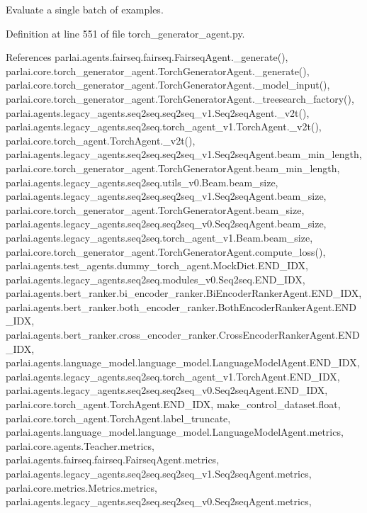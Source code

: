 \begin{DoxyVerb}Evaluate a single batch of examples.\end{DoxyVerb}
 

Definition at line 551 of file torch\+\_\+generator\+\_\+agent.\+py.



References parlai.\+agents.\+fairseq.\+fairseq.\+Fairseq\+Agent.\+\_\+generate(), parlai.\+core.\+torch\+\_\+generator\+\_\+agent.\+Torch\+Generator\+Agent.\+\_\+generate(), parlai.\+core.\+torch\+\_\+generator\+\_\+agent.\+Torch\+Generator\+Agent.\+\_\+model\+\_\+input(), parlai.\+core.\+torch\+\_\+generator\+\_\+agent.\+Torch\+Generator\+Agent.\+\_\+treesearch\+\_\+factory(), parlai.\+agents.\+legacy\+\_\+agents.\+seq2seq.\+seq2seq\+\_\+v1.\+Seq2seq\+Agent.\+\_\+v2t(), parlai.\+agents.\+legacy\+\_\+agents.\+seq2seq.\+torch\+\_\+agent\+\_\+v1.\+Torch\+Agent.\+\_\+v2t(), parlai.\+core.\+torch\+\_\+agent.\+Torch\+Agent.\+\_\+v2t(), parlai.\+agents.\+legacy\+\_\+agents.\+seq2seq.\+seq2seq\+\_\+v1.\+Seq2seq\+Agent.\+beam\+\_\+min\+\_\+length, parlai.\+core.\+torch\+\_\+generator\+\_\+agent.\+Torch\+Generator\+Agent.\+beam\+\_\+min\+\_\+length, parlai.\+agents.\+legacy\+\_\+agents.\+seq2seq.\+utils\+\_\+v0.\+Beam.\+beam\+\_\+size, parlai.\+agents.\+legacy\+\_\+agents.\+seq2seq.\+seq2seq\+\_\+v1.\+Seq2seq\+Agent.\+beam\+\_\+size, parlai.\+core.\+torch\+\_\+generator\+\_\+agent.\+Torch\+Generator\+Agent.\+beam\+\_\+size, parlai.\+agents.\+legacy\+\_\+agents.\+seq2seq.\+seq2seq\+\_\+v0.\+Seq2seq\+Agent.\+beam\+\_\+size, parlai.\+agents.\+legacy\+\_\+agents.\+seq2seq.\+torch\+\_\+agent\+\_\+v1.\+Beam.\+beam\+\_\+size, parlai.\+core.\+torch\+\_\+generator\+\_\+agent.\+Torch\+Generator\+Agent.\+compute\+\_\+loss(), parlai.\+agents.\+test\+\_\+agents.\+dummy\+\_\+torch\+\_\+agent.\+Mock\+Dict.\+E\+N\+D\+\_\+\+I\+DX, parlai.\+agents.\+legacy\+\_\+agents.\+seq2seq.\+modules\+\_\+v0.\+Seq2seq.\+E\+N\+D\+\_\+\+I\+DX, parlai.\+agents.\+bert\+\_\+ranker.\+bi\+\_\+encoder\+\_\+ranker.\+Bi\+Encoder\+Ranker\+Agent.\+E\+N\+D\+\_\+\+I\+DX, parlai.\+agents.\+bert\+\_\+ranker.\+both\+\_\+encoder\+\_\+ranker.\+Both\+Encoder\+Ranker\+Agent.\+E\+N\+D\+\_\+\+I\+DX, parlai.\+agents.\+bert\+\_\+ranker.\+cross\+\_\+encoder\+\_\+ranker.\+Cross\+Encoder\+Ranker\+Agent.\+E\+N\+D\+\_\+\+I\+DX, parlai.\+agents.\+language\+\_\+model.\+language\+\_\+model.\+Language\+Model\+Agent.\+E\+N\+D\+\_\+\+I\+DX, parlai.\+agents.\+legacy\+\_\+agents.\+seq2seq.\+torch\+\_\+agent\+\_\+v1.\+Torch\+Agent.\+E\+N\+D\+\_\+\+I\+DX, parlai.\+agents.\+legacy\+\_\+agents.\+seq2seq.\+seq2seq\+\_\+v0.\+Seq2seq\+Agent.\+E\+N\+D\+\_\+\+I\+DX, parlai.\+core.\+torch\+\_\+agent.\+Torch\+Agent.\+E\+N\+D\+\_\+\+I\+DX, make\+\_\+control\+\_\+dataset.\+float, parlai.\+core.\+torch\+\_\+agent.\+Torch\+Agent.\+label\+\_\+truncate, parlai.\+agents.\+language\+\_\+model.\+language\+\_\+model.\+Language\+Model\+Agent.\+metrics, parlai.\+core.\+agents.\+Teacher.\+metrics, parlai.\+agents.\+fairseq.\+fairseq.\+Fairseq\+Agent.\+metrics, parlai.\+agents.\+legacy\+\_\+agents.\+seq2seq.\+seq2seq\+\_\+v1.\+Seq2seq\+Agent.\+metrics, parlai.\+core.\+metrics.\+Metrics.\+metrics, parlai.\+agents.\+legacy\+\_\+agents.\+seq2seq.\+seq2seq\+\_\+v0.\+Seq2seq\+Agent.\+metrics, 